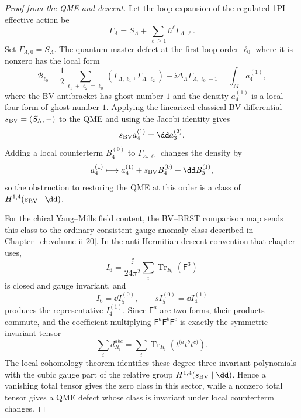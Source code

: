 \begin{proof}[Proof from the QME and descent]
Let the loop expansion of the regulated 1PI effective action be
\[
  \Gamma_\Lambda
  =
  S_\Lambda+\sum_{\ell\ge1}\hbar^\ell\Gamma_{\Lambda,\ell}.
\]
Set \(\Gamma_{\Lambda,0}=S_\Lambda\).
The quantum master defect at the first loop order \(\ell_0\) where it is
nonzero has the local form
\[
  \mathcal B_{\ell_0}
  =
  \frac12\sum_{\ell_1+\ell_2=\ell_0}
  (\Gamma_{\Lambda,\ell_1},\Gamma_{\Lambda,\ell_2})
  -\ii\Delta_\Lambda\Gamma_{\Lambda,\ell_0-1}
  =
  \int_M a_4^{(1)} ,
\]
where the BV antibracket has ghost number \(1\) and the density
\(a_4^{(1)}\) is a local four-form of ghost number \(1\).  Applying the
linearized classical BV differential \(s_{\rm BV}=(S_\Lambda,-)\) to the QME
and using the Jacobi identity gives
\[
  s_{\rm BV} a_4^{(1)}=\dd a_3^{(2)} .
\]
Adding a local counterterm \(B_4^{(0)}\) to
\(\Gamma_{\Lambda,\ell_0}\) changes the density by
\[
  a_4^{(1)}
  \longmapsto
  a_4^{(1)}+s_{\rm BV}B_4^{(0)}+\dd B_3^{(1)} ,
\]
so the obstruction to restoring the QME at this order is a class of
\(H^{1,4}(s_{\rm BV}\mid\dd)\).

For the chiral Yang--Mills field content, the BV--BRST comparison map sends
this class to the ordinary consistent gauge-anomaly class described in
Chapter~\ref{ch:volume-ii-20}.  In the anti-Hermitian descent convention that
chapter uses,
\[
  I_6
  =
  \frac{\ii}{24\pi^2}
  \sum_i\operatorname{Tr}_{R_i}(\mathsf F^3)
\]
is closed and gauge invariant, and
\[
  I_6=\dd I_5^{(0)},\qquad sI_5^{(0)}=\dd I_4^{(1)}
\]
produces the representative \(I_4^{(1)}\).  Since \(\mathsf F^a\) are
two-forms, their products commute, and the coefficient multiplying
\(\mathsf F^a\mathsf F^b\mathsf F^c\) is exactly the symmetric invariant
tensor
\[
  \sum_i d_{R_i}^{abc}
  =
  \sum_i\operatorname{Tr}_{R_i}(t^{(a}t^bt^{c)}).
\]
The local cohomology theorem identifies these degree-three invariant
polynomials with the cubic gauge part of the relative group
\(H^{1,4}(s_{\rm BV}\mid\dd)\).  Hence a vanishing total tensor gives the
zero class in this sector, while a nonzero total tensor gives a QME defect
whose class is invariant under local counterterm changes.


\end{proof}
